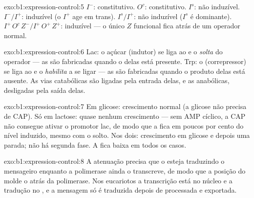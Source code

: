 \begin{solution}{exo:b1:expression-control:5}
$I^-$: constitutivo. $O^c$: constitutivo. $I^s$: não induzível.
$I^-/I^+$: induzível (o  $I^+$ age em trans). $I^s/I^+$: não
induzível ($I^s$ é dominante). $I^+\,O^c\,Z^- / I^+\,O^+\,Z^+$:
induzível --- o único $Z$ funcional fica atrás de um operador normal.
\end{solution}

\begin{solution}{exo:b1:expression-control:6}
Lac: o açúcar (indutor) se liga ao  e o \emph{solta} do
operador --- as  são fabricadas quando o  delas está
presente. Trp: o  (correpressor) se liga ao  e o
\emph{habilita} a se ligar --- as  são fabricadas quando o
produto delas está ausente. As vias catabólicas são ligadas pela entrada
delas, e as anabólicas, desligadas pela saída delas.
\end{solution}

\begin{solution}{exo:b1:expression-control:7}
Em glicose: crescimento normal (a glicose não precisa de CAP). Só em
lactose: quase nenhum crescimento --- sem AMP cíclico, a CAP não
consegue ativar o promotor lac, de modo que a  fica em poucos por
cento do nível induzido, mesmo com o  solto. Nos dois:
crescimento em glicose e depois uma parada; não há segunda fase. A
 fica baixa em todos os casos.
\end{solution}

\begin{solution}{exo:b1:expression-control:8}
A atenuação precisa que o  esteja traduzindo o mensageiro
enquanto a polimerase ainda o transcreve, de modo que a posição do
 molde o  atrás da polimerase. Nos eucariotos a transcrição
está no núcleo e a tradução no , e a mensagem só é traduzida
depois de processada e exportada.
\end{solution}

